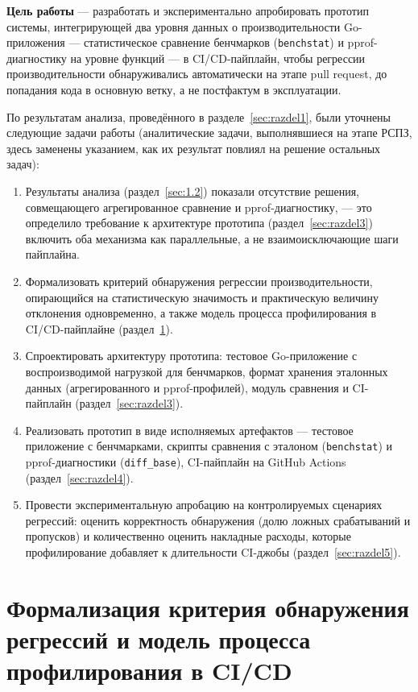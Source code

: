 \documentclass[12pt,a4paper]{article}
\newcommand{\newrazdel}{\clearpage}
\numberwithin{equation}{section}
\begin{document}
\textbf{Цель работы} — разработать и экспериментально апробировать прототип
системы, интегрирующей два уровня данных о производительности
Go-приложения — статистическое сравнение бенчмарков (\texttt{benchstat}) и
pprof-диагностику на уровне функций — в CI/CD-пайплайн, чтобы регрессии
производительности обнаруживались автоматически на этапе pull request, до
попадания кода в основную ветку, а не постфактум в эксплуатации.

По результатам анализа, проведённого в разделе~\ref{sec:razdel1}, были
уточнены следующие задачи работы (аналитические задачи, выполнявшиеся на
этапе РСПЗ, здесь заменены указанием, как их результат повлиял на решение
остальных задач):

\begin{enumerate}
\item Результаты анализа (раздел~\ref{sec:1.2}) показали отсутствие
решения, совмещающего агрегированное сравнение и pprof-диагностику, —
это определило требование к архитектуре прототипа (раздел~\ref{sec:razdel3})
включить оба механизма как параллельные, а не взаимоисключающие шаги
пайплайна.
\item Формализовать критерий обнаружения регрессии производительности,
опирающийся на статистическую значимость и практическую величину отклонения
одновременно, а также модель процесса профилирования в CI/CD-пайплайне
(раздел~\ref{sec:razdel2}).
\item Спроектировать архитектуру прототипа: тестовое Go-приложение с
воспроизводимой нагрузкой для бенчмарков, формат хранения эталонных данных
(агрегированного и pprof-профилей), модуль сравнения и CI-пайплайн
(раздел~\ref{sec:razdel3}).
\item Реализовать прототип в виде исполняемых артефактов — тестовое
приложение с бенчмарками, скрипты сравнения с эталоном (\texttt{benchstat})
и pprof-диагностики (\texttt{diff\_base}), CI-пайплайн на GitHub Actions
(раздел~\ref{sec:razdel4}).
\item Провести экспериментальную апробацию на контролируемых сценариях
регрессий: оценить корректность обнаружения (долю ложных срабатываний и
пропусков) и количественно оценить накладные расходы, которые
профилирование добавляет к длительности CI-джобы (раздел~\ref{sec:razdel5}).
\end{enumerate}

\newrazdel
\section{Формализация критерия обнаружения регрессий и модель процесса профилирования в CI/CD}
\label{sec:razdel2}
\end{document}

